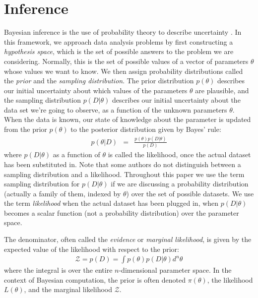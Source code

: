 \documentclass[useAMS,usenatbib]{mn2e}
\begin{document}
\section{Inference}
Bayesian inference is the use of probability theory to describe uncertainty
\citep{sivia, ohagan}. In this framework, we approach data analysis problems by first
constructing a {\it hypothesis space}, which is the set of possible answers
to the problem we are considering. Normally, this is the set of possible
values of a vector of parameters $\theta$ whose values we want
to know. We then assign probability distributions
called the {\it prior} and the {\it sampling distribution}. The prior
distribution $p(\theta)$ describes
our initial uncertainty about which values of the parameters
$\theta$ are plausible, and the
sampling distribution $p(D | \theta)$ describes
our initial uncertainty about the data set we're going to observe, as a
function of the unknown parameters $\theta$.
When the data is known, our state of knowledge about the parameter is
updated from the prior $p(\theta)$ to the posterior distribution given by
Bayes' rule:
\begin{eqnarray}
p(\theta | D) &=&
\frac{p(\theta)p(D | \theta)}
{p(D)}
\end{eqnarray}
where $p(D | \theta)$ as a function of $\theta$ is called the likelihood,
once the actual dataset has been substituted in. Note that some authors do not
distinguish between a
sampling distribution and a likelihood. Throughout this paper we use the term
sampling distribution for $p(D|\theta)$ if we are discussing a probability
distribution (actually a family of them, indexed by $\theta$)
over the set of possible datasets. We use the term {\it likelihood}
when the actual dataset has been plugged in, when $p(D|\theta)$
becomes a scalar function (not a probability distribution)
over the parameter space.

The denominator, often called the {\it evidence} or
{\it marginal likelihood}, is given by the expected value of the likelihood
with respect to the prior:
\begin{eqnarray}
\mathcal{Z} = p(D) = \int p(\theta) p(D | \theta) d^n \theta
\end{eqnarray}
where the integral is over the entire $n$-dimensional parameter space.
In the context of Bayesian computation, the prior is often denoted $\pi(\theta)$,
the likelihood $L(\theta)$, and the marginal likelihood $\mathcal{Z}$.
\end{document}

